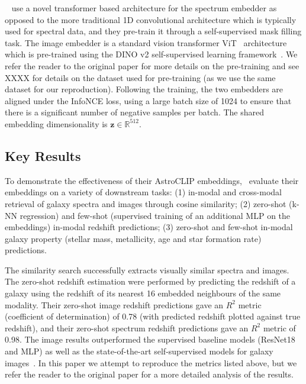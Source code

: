 ~\cite{astroclip} use a novel transformer based architecture for the spectrum embedder as opposed to the more traditional
1D convolutional architecture which is typically used for spectral data, and they pre-train it through a self-supervised
mask filling task.
The image embedder is a standard vision transformer ViT~\citep{dosovitskiy2021} architecture which is pre-trained using
the DINO v2 self-supervised learning framework~\citep{oquab2024}.
We refer the reader to the original paper for more details on the pre-training and see XXXX for details on the dataset
used for pre-training (as we use the same dataset for our reproduction).
Following the training, the two embedders are aligned under the InfoNCE loss, using a large batch size of 1024 to ensure
that there is a significant number of negative samples per batch.
The shared embedding dimensionality is $\mathbf{z} \in \mathbb{R}^{512}$.

\subsection{Key Results}\label{subsec:original-paper-key-results}
To demonstrate the effectiveness of their AstroCLIP embeddings,~\cite{astroclip} evaluate their embeddings on a variety
of downstream tasks: (1) in-modal and cross-modal retrieval of galaxy spectra and images through cosine similarity; (2)
zero-shot (k-NN regression) and few-shot (supervised training of an additional MLP on the embeddings) in-modal redshift
predictions; (3) zero-shot and few-shot in-modal galaxy property (stellar mass, metallicity, age and star formation rate)
predictions.

The similarity search successfully extracts visually similar spectra and images.
The zero-shot redshift estimation were performed by predicting the redshift of a galaxy using the redshift of its nearest
16 embedded neighbours of the same modality.
Their zero-shot image redshift predictions gave an $R^{2}$ metric (coefficient of determination) of 0.78 (with predicted
redshift plotted against true redshift), and their zero-shot spectrum redshift predictions gave an $R^{2}$ metric of 0.98.
The image results outperformed the supervised baseline models (ResNet18 and MLP) as well as the state-of-the-art
self-supervised models for galaxy images~\citep{stein2021}.
In this paper we attempt to reproduce the metrics listed above, but we refer the reader to the original paper for a
more detailed analysis of the results.

